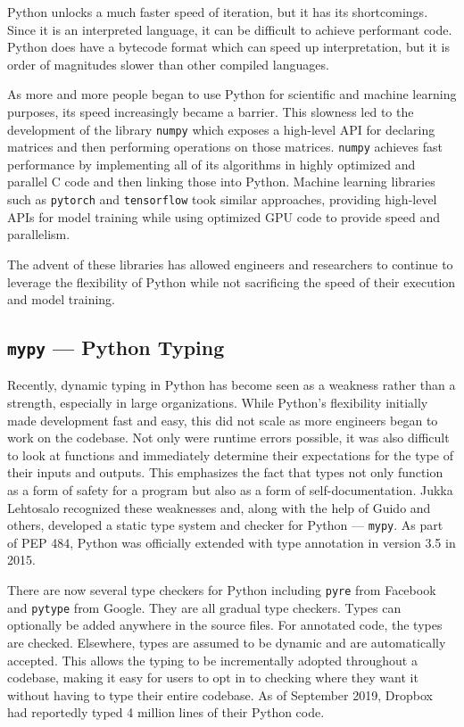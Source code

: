 \documentclass{book}
\begin{document}
Python unlocks a much faster speed of iteration, but it has its shortcomings. Since it is an interpreted language, it can be difficult to achieve performant code. Python does have a bytecode format which can speed up interpretation, but it is order of magnitudes slower than other compiled languages.

As more and more people began to use Python for scientific and machine learning purposes, its speed increasingly became a barrier. This slowness led to the development of the library \texttt{numpy} which exposes a high-level API for declaring matrices and then performing operations on those matrices. \texttt{numpy} achieves fast performance by implementing all of its algorithms in highly optimized and parallel C code and then linking those into Python. Machine learning libraries such as \texttt{pytorch} and \texttt{tensorflow} took similar approaches, providing high-level APIs for model training while using optimized GPU code to provide speed and parallelism.

The advent of these libraries has allowed engineers and researchers to continue to leverage the flexibility of Python while not sacrificing the speed of their execution and model training.

\subsection{\texttt{mypy} --- Python Typing}

Recently, dynamic typing in Python has become seen as a weakness rather than a strength, especially in large organizations. While Python's flexibility initially made development fast and easy, this did not scale as more engineers began to work on the codebase. Not only were runtime errors possible, it was also difficult to look at functions and immediately determine their expectations for the type of their inputs and outputs. This emphasizes the fact that types not only function as a form of safety for a program but also as a form of self-documentation. Jukka Lehtosalo recognized these weaknesses and, along with the help of Guido and others, developed a static type system and checker for Python --- \texttt{mypy}. As part of PEP 484, Python was officially extended with type annotation in version 3.5 in 2015.

There are now several type checkers for Python including \texttt{pyre} from Facebook and \texttt{pytype} from Google. They are all gradual type checkers. Types can optionally be added anywhere in the source files. For annotated code, the types are checked. Elsewhere, types are assumed to be dynamic and are automatically accepted. This allows the typing to be incrementally adopted throughout a codebase, making it easy for users to opt in to checking where they want it without having to type their entire codebase. As of September 2019, Dropbox had reportedly typed 4 million lines of their Python code.
\end{document}
